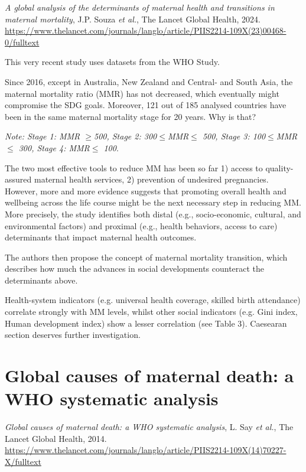 \documentclass[a4paper,12pt]{article}
\begin{document}
\textit{A global analysis of the determinants of maternal health and transitions in maternal mortality}, J.P. Souza \textit{et al.}, The Lancet Global Health, 2024.\\
\url{https://www.thelancet.com/journals/langlo/article/PIIS2214-109X(23)00468-0/fulltext}

This very recent study uses datasets from the WHO Study. 

Since 2016, except in Australia, New Zealand and Central- and South Asia, the maternal mortality ratio (MMR) has not decreased, which eventually might compromise the SDG goals. Moreover, 121 out of 185 analysed countries have been in the same maternal mortality stage for 20 years. Why is that?

\textit{Note: Stage 1: MMR $\geq$500, Stage 2: 300$\leq$MMR$\leq$ 500, Stage 3: 100$\leq$MMR$\leq$ 300, Stage 4: MMR$\leq$ 100}.

The two most effective tools to reduce MM has been so far 1) access to quality-assured maternal health services, 2) prevention of undesired pregnancies. However, more and more evidence suggests that promoting overall health and wellbeing across the life course might be the next necessary step in reducing MM. More precisely, the study identifies both distal (e.g., socio-economic, cultural, and environmental factors) and proximal (e.g., health behaviors, access to care) determinants that impact maternal health outcomes.

The authors then propose the concept of maternal mortality transition, which describes how much the advances in social developments counteract the determinants above. 

Health-system indicators (e.g. universal health coverage, skilled birth attendance) correlate strongly with MM levels, whilst other social indicators (e.g. Gini index, Human development index) show a lesser correlation (see Table 3). Caesearan section deserves further investigation.

\section{Global causes of maternal death: a WHO systematic analysis}

\textit{Global causes of maternal death: a WHO systematic analysis}, L. Say \textit{et al.}, The Lancet Global Health, 2014.\\
\url{https://www.thelancet.com/journals/langlo/article/PIIS2214-109X(14)70227-X/fulltext}
\end{document}
